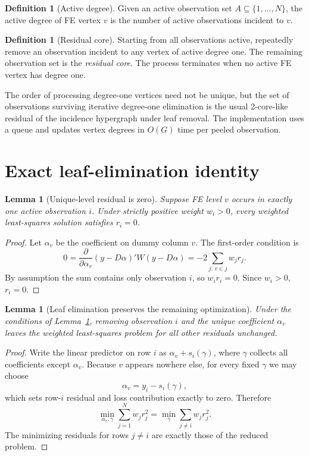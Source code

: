 \documentclass[11pt]{article}
\newtheorem{lemma}[theorem]{Lemma}
\theoremstyle{definition}
\newtheorem{definition}[theorem]{Definition}
\newcommand{\1}{\mathbf{1}}
\begin{document}
\begin{definition}[Active degree]
Given an active observation set $A\subseteq\{1,\dots,N\}$, the active degree of FE vertex $v$ is the number of active observations incident to $v$.
\end{definition}

\begin{definition}[Residual core]
Starting from all observations active, repeatedly remove an observation incident to any vertex of active degree one. The remaining observation set is the \emph{residual core}. The process terminates when no active FE vertex has degree one.
\end{definition}

The order of processing degree-one vertices need not be unique, but the set of observations surviving iterative degree-one elimination is the usual 2-core-like residual of the incidence hypergraph under leaf removal. The implementation uses a queue and updates vertex degrees in $O(G)$ time per peeled observation.

\section{Exact leaf-elimination identity}

\begin{lemma}[Unique-level residual is zero]\label{lem:zero}
Suppose FE level $v$ occurs in exactly one active observation $i$. Under strictly positive weight $w_i>0$, every weighted least-squares solution satisfies $r_i=0$.
\end{lemma}
\begin{proof}
Let $\alpha_v$ be the coefficient on dummy column $v$. The first-order condition is
\[
  0=\frac{\partial}{\partial \alpha_v}(y-D\alpha)'W(y-D\alpha)
   = -2\sum_{j:\,v\in j} w_j r_j.
\]
By assumption the sum contains only observation $i$, so $w_i r_i=0$. Since $w_i>0$, $r_i=0$.
\end{proof}

\begin{lemma}[Leaf elimination preserves the remaining optimization]\label{lem:elim}
Under the conditions of Lemma~\ref{lem:zero}, removing observation $i$ and the unique coefficient $\alpha_v$ leaves the weighted least-squares problem for all other residuals unchanged.
\end{lemma}
\begin{proof}
Write the linear predictor on row $i$ as $\alpha_v+s_i(\gamma)$, where $\gamma$ collects all coefficients except $\alpha_v$. Because $v$ appears nowhere else, for every fixed $\gamma$ we may choose
\[
  \alpha_v=y_i-s_i(\gamma),
\]
which sets row-$i$ residual and loss contribution exactly to zero. Therefore
\[
  \min_{\alpha_v,\gamma}\sum_{j=1}^N w_j r_j^2
  = \min_{\gamma}\sum_{j\ne i} w_j r_j^2.
\]
The minimizing residuals for rows $j\ne i$ are exactly those of the reduced problem.
\end{proof}
\end{document}
